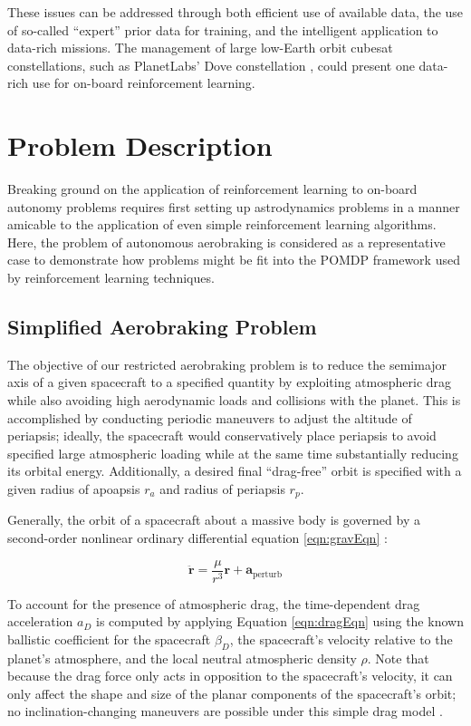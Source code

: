 \documentclass[paper,11pt]{AAS}		%
\begin{document}
These issues can be addressed through both efficient use of available data, the use of so-called ``expert'' prior data for training, and the intelligent application to data-rich missions. The management of large low-Earth orbit cubesat constellations, such as PlanetLabs' Dove constellation \cite{Foster2016}, could present one data-rich use for on-board reinforcement learning.

\section{Problem Description}
\label{sec:problemDisc}
Breaking ground on the application of reinforcement learning to on-board autonomy problems requires first setting up astrodynamics problems in a manner amicable to the application of even simple reinforcement learning algorithms. Here, the problem of autonomous aerobraking is considered as a representative case to demonstrate how problems might be fit into the POMDP framework used by reinforcement learning techniques.


\subsection{Simplified Aerobraking Problem}

The objective of our restricted aerobraking problem is to reduce the semimajor axis of a given spacecraft to a specified quantity by exploiting atmospheric drag while also avoiding high aerodynamic loads and  collisions with the planet. This is accomplished by conducting periodic maneuvers to adjust the altitude of periapsis; ideally, the spacecraft would conservatively place periapsis to avoid specified large atmospheric loading while at the same time substantially reducing its orbital energy. Additionally, a desired final ``drag-free'' orbit is specified with a given radius of apoapsis $r_a$ and radius of periapsis $r_p$. 

Generally, the orbit of a spacecraft about a massive body is governed by a second-order nonlinear ordinary differential 
equation \ref{eqn:gravEqn} \cite{Vallado2013}:

\begin{equation}
\ddot{\bm{r}} = \frac{\mu}{r^3} \bm{r} + \bm{a}_{\text{perturb}}
\label{eqn:gravEqn}
\end{equation}

To account for the presence of atmospheric drag, the time-dependent drag acceleration $a_D$ is computed by applying Equation 
\ref{eqn:dragEqn} \cite{Vallado2013} using the known ballistic coefficient for the spacecraft $\beta_D$, the spacecraft's velocity 
relative to the planet's atmosphere, and the local neutral atmospheric density $\rho$.  Note that because the drag force only acts in 
opposition to the spacecraft's velocity, it can only affect the shape and size of the planar components of the spacecraft's 
orbit; no inclination-changing maneuvers are possible under this simple drag model \cite{Sutton2008}.
\end{document}
